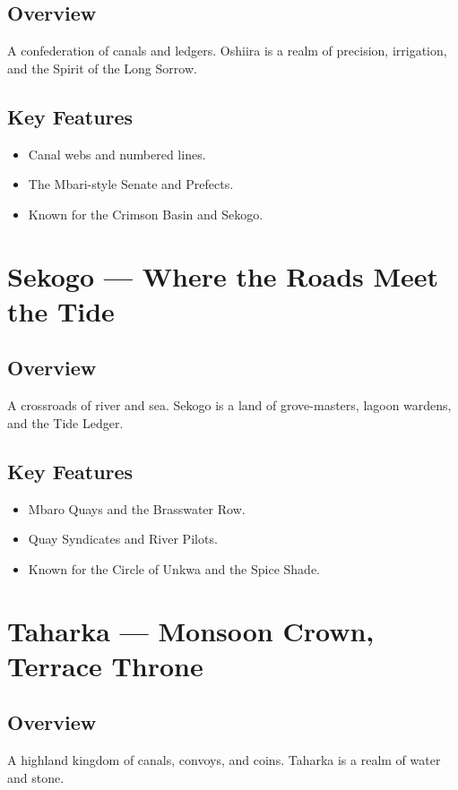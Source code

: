 \subsection*{Overview}
A confederation of canals and ledgers. Oshiira is a realm of precision, irrigation, and the Spirit of the Long Sorrow.

\subsection*{Key Features}
\begin{itemize}[leftmargin=*]
    \item Canal webs and numbered lines.
    \item The Mbari-style Senate and Prefects.
    \item Known for the Crimson Basin and Sekogo.
\end{itemize}

\section{Sekogo — Where the Roads Meet the Tide}
\label{sec:lore-sekogo}

\subsection*{Overview}
A crossroads of river and sea. Sekogo is a land of grove-masters, lagoon wardens, and the Tide Ledger.

\subsection*{Key Features}
\begin{itemize}[leftmargin=*]
    \item Mbaro Quays and the Brasswater Row.
    \item Quay Syndicates and River Pilots.
    \item Known for the Circle of Unkwa and the Spice Shade.
\end{itemize}

\section{Taharka — Monsoon Crown, Terrace Throne}
\label{sec:lore-taharka}

\subsection*{Overview}
A highland kingdom of canals, convoys, and coins. Taharka is a realm of water and stone.

